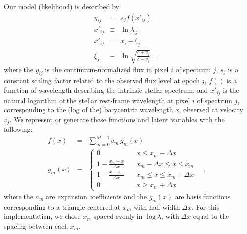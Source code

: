 \documentclass[12pt, letterpaper]{article}
\newcommand{\given}{\,|\,}
\newcommand{\normal}{{\mathcal{N}}}
\begin{document}
Our model (likelihood) is described by
\begin{eqnarray}
   y_{ij} &=& s_j f(x'_{ij})
  \\
  x'_{ij} &\equiv& \ln \lambda_{ij}
  \\
  x'_{ij} &=& x_i + \xi_j
  \\
  \xi_j &\equiv& \ln \sqrt{\frac{c + v_j}{c - v_j}}
  \quad , 
\end{eqnarray}
where the $y_{ij}$ is the continuum-normalized flux in pixel $i$ of
spectrum $j$, $s_j$ is a constant scaling factor related to the observed
flux level at epoch $j$, $f()$ is a function of
wavelength describing the intrinsic stellar spectrum, and
$x'_{ij}$ is the natural logarithm of the stellar rest-frame wavelength
at pixel $i$ of spectrum $j$, 
corresponding to the (log of the) barycentric wavelength $x_i$ observed at
velocity $v_j$.
We represent or generate these functions and latent variables
with the following:
\begin{eqnarray}
  f(x) &=& \sum_{m=0}^{M-1} a_m\,g_m(x)
  \\
  g_m(x) &=& \left\{
        \begin{array}{ll}
            0 & \quad x \leq x_m -\Delta x \\
            1 - \frac{x_m - x}{\Delta x} & \quad x_m - \Delta x \leq x \leq x_m \\
            1 - \frac{x - x_m}{\Delta x} & \quad x_m \leq x \leq x_m + \Delta x \\
            0 & \quad x \geq x_m + \Delta x \label{eqn:triangle}
        \end{array}
    \right.
  \quad ,
\end{eqnarray}
where the $a_m$ are expansion coefficients and the $g_m(x)$
are basis functions corresponding to a triangle centered at $x_m$ with half-width 
$\Delta x$. For this implementation, we chose $x_m$ spaced evenly in $\log \lambda$, 
with $\Delta x$ equal to the spacing between each $x_m$.
\end{document}
